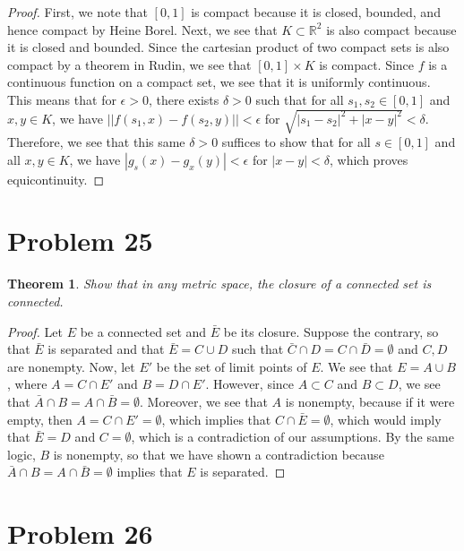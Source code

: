 \documentclass[psamsfonts]{amsart}
\newtheorem{thm}{Theorem}[section]
\theoremstyle{definition}
\theoremstyle{remark}
\numberwithin{equation}{section}
\begin{document}
\begin{proof}
First, we note that $[0,1]$ is compact because it is closed, bounded, and hence compact by Heine Borel. Next, we see that $K \subset \mathbb{R}^2$ is also compact because it is closed and bounded. Since the cartesian product of two compact sets is also compact by a theorem in Rudin, we see that $[0,1] \times K$ is compact. Since $f$ is a continuous function on a compact set, we see that it is uniformly continuous. This means that for $\epsilon > 0$, there exists $\delta > 0$ such that for all $s_1,s_2 \in [0,1]$ and $x,y \in K$, we have $|| f(s_1,x) - f(s_2,y) || < \epsilon$ for $\sqrt{| s_1 - s_2 |^2 + |x - y|^2} < \delta$. Therefore, we see that this same $\delta > 0$ suffices to show that for all $s \in [0,1]$ and all $x,y \in K$, we have $|g_s (x) - g_x(y)| < \epsilon$ for $|x - y| < \delta$, which proves equicontinuity.
\end{proof}

\section{Problem 25}

\begin{thm}
Show that in any metric space, the closure of a connected set is connected. 
\end{thm}

\begin{proof}
Let $E$ be a connected set and $\bar{E}$ be its closure. Suppose the contrary, so that $\bar{E}$ is separated and that $\bar{E} = C \cup D$ such that $\bar{C} \cap D = C \cap \bar{D} = \emptyset$ and $C,D$ are nonempty. Now, let $E'$ be the set of limit points of $E$. We see that $E = A \cup B$, where $A = C \cap E'$ and $B = D \cap E'$. However, since $A \subset C$ and $B \subset D$, we see that $\bar{A} \cap B = A \cap \bar{B} = \emptyset$. Moreover, we see that $A$ is nonempty, because if it were empty, then $A = C \cap E' = \emptyset$, which implies that $C \cap \bar{E} = \emptyset$, which would imply that $\bar{E} = D$ and $C = \emptyset$, which is a contradiction of our assumptions. By the same logic, $B$ is nonempty, so that we have shown a contradiction because $\bar{A} \cap B = A \cap \bar{B} = \emptyset$ implies that $E$ is separated.
\end{proof}

\section{Problem 26}
\end{document}

